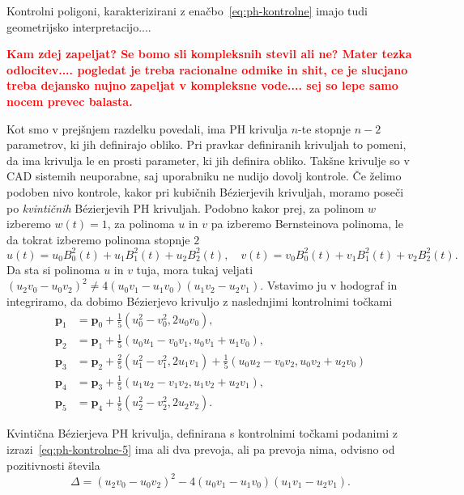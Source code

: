 \documentclass[isrm2, tisk]{fmfdelo}
\newcommand{\p}{\mathbf{p}}
\newcommand{\mycomment}[1]{\textbf{\textcolor{red}{#1}}}
\begin{document}
    Kontrolni poligoni, karakterizirani z enačbo~\eqref{eq:ph-kontrolne} imajo tudi geometrijsko interpretacijo....

    \mycomment{ Kam zdej zapeljat? Se bomo sli kompleksnih stevil ali ne? Mater tezka odlocitev.... pogledat je treba racionalne odmike in shit, ce je slucjano treba dejansko nujno zapeljat v kompleksne vode.... sej so lepe samo nocem prevec balasta.}

    Kot smo v prejšnjem razdelku povedali, ima PH krivulja $n$-te stopnje $n-2$ parametrov, ki jih definirajo obliko.
    Pri pravkar definiranih krivuljah to pomeni, da ima krivulja le en prosti parameter, ki jih definira obliko.
    Takšne krivulje so v CAD sistemih neuporabne, saj uporabniku ne nudijo dovolj kontrole.
    Če želimo podoben nivo kontrole, kakor pri kubičnih Bézierjevih krivuljah, moramo poseči po \textit{kvintičnih} Bézierjevih PH krivuljah.
    Podobno kakor prej, za polinom $w$ izberemo $w(t)=1$, za polinoma $u$ in $v$ pa izberemo Bernsteinova polinoma, le da tokrat izberemo polinoma stopnje $2$
    \[u(t)=u_0B_{0}^{2}(t)+u_1B_{1}^{2}(t)+u_2B_{2}^{2}(t),\quad v(t)=v_0B_{0}^{2}(t)+v_1B_{1}^{2}(t)+v_2B_{2}^{2}(t).\]
    Da sta si polinoma $u$ in $v$ tuja, mora tukaj veljati $(u_2 v_0 -u_0 v_2)^2 \neq 4(u_0 v_1 - u_1 v_0)(u_1 v_2-u_2v_1)$.
    Vstavimo ju v hodograf in integriramo, da dobimo Bézierjevo krivuljo z naslednjimi kontrolnimi točkami
    \begin{align}
        \p_1 &=\p_0+\frac{1}{5}(u_0^2-v_0^2,2u_0v_0), \nonumber\\
        \p_2 &= \p_1+\frac{1}{5}(u_0u_1-v_0v_1, u_0v_1+u_1v_0),\nonumber\\
        \p_3 &= \p_2 + \frac{2}{5}(u_1^2-v_1^2, 2u_1v_1) + \frac{1}{5}(u_0u_2-v_0v_2, u_0v_2+u_2v_0) \nonumber \\
        \p_4 &= \p_3+\frac{1}{5}(u_1u_2-v_1v_2, u_1v_2+u_2v_1),\nonumber\\
        \p_5 &=\p_4+\frac{1}{5}(u_2^2-v_2^2,2u_2v_2).  \label{eq:ph-kontrolne-5}
    \end{align}

    \begin{lema}
        Kvintična Bézierjeva PH krivulja, definirana s kontrolnimi točkami podanimi z izrazi~\eqref{eq:ph-kontrolne-5} ima ali dva prevoja, ali pa prevoja nima, odvisno od pozitivnosti števila \[\Delta = (u_2v_0-u_0v_2)^2 - 4(u_0v_1-u_1v_0)(u_1v_1-u_2v_1).\]
    \end{lema}
\end{document}
